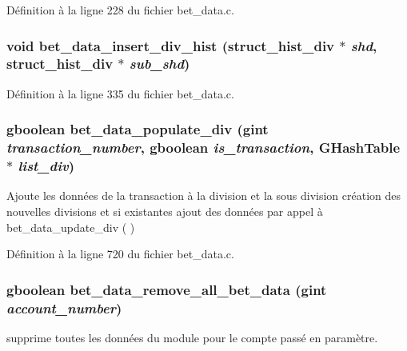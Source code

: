 Définition à la ligne 228 du fichier bet\_\-data.c.

\subsubsection[{bet\_\-data\_\-insert\_\-div\_\-hist}]{\setlength{\rightskip}{0pt plus 5cm}void bet\_\-data\_\-insert\_\-div\_\-hist ({\bf struct\_\-hist\_\-div} $\ast$ {\em shd}, \/  {\bf struct\_\-hist\_\-div} $\ast$ {\em sub\_\-shd})}\label{bet__data_8c_ad0f230cc72b4bb9181f91d2ede65709b}


Définition à la ligne 335 du fichier bet\_\-data.c.

\subsubsection[{bet\_\-data\_\-populate\_\-div}]{\setlength{\rightskip}{0pt plus 5cm}gboolean bet\_\-data\_\-populate\_\-div (gint {\em transaction\_\-number}, \/  gboolean {\em is\_\-transaction}, \/  GHashTable $\ast$ {\em list\_\-div})}\label{bet__data_8c_a0de6607543e7a4e0f2051394707631b5}
Ajoute les données de la transaction à la division et la sous division création des nouvelles divisions et si existantes ajout des données par appel à bet\_\-data\_\-update\_\-div ( ) 

Définition à la ligne 720 du fichier bet\_\-data.c.

\subsubsection[{bet\_\-data\_\-remove\_\-all\_\-bet\_\-data}]{\setlength{\rightskip}{0pt plus 5cm}gboolean bet\_\-data\_\-remove\_\-all\_\-bet\_\-data (gint {\em account\_\-number})}\label{bet__data_8c_a9dbd4a0c3a7673f2972be160d341dd93}
supprime toutes les données du module pour le compte passé en paramètre. 

